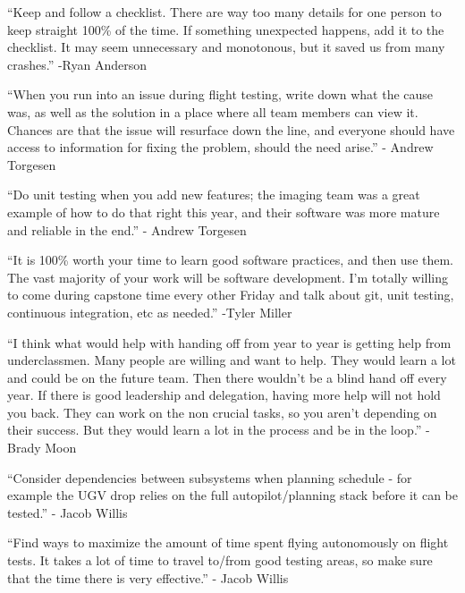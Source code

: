 \documentclass[]{auvsi_doc}
\begin{document}
{}

{``Keep and follow a checklist. There are way too many details for one
person to keep straight 100\% of the time. If something unexpected
happens, add it to the checklist. It may seem unnecessary and
monotonous, but it saved us from many crashes.'' -Ryan Anderson}

{}

{``When you run into an issue during flight testing, write down what the
cause was, as well as the solution in a place where all team members can
view it. Chances are that the issue will resurface down the line, and
everyone should have access to information for fixing the problem,
should the need arise.'' - Andrew Torgesen}

{}

{``Do unit testing when you add new features; the imaging team was a
great example of how to do that right this year, and their software was
more mature and reliable in the end.'' - Andrew Torgesen}

{}

{``It is 100\% worth your time to learn good software practices, and
then use them. The vast majority of your work will be software
development. I'm totally willing to come during capstone time every
other Friday and talk about git, unit testing, continuous integration,
etc as needed.'' -Tyler Miller}

{}

{``I think what would help with handing off from year to year is getting
help from underclassmen. Many people are willing and want to help. They
would learn a lot and could be on the future team. Then there wouldn't
be a blind hand off every year. If there is good leadership and
delegation, having more help will not hold you back. They can work on
the non crucial tasks, so you aren't depending on their success. But
they would learn a lot in the process and be in the loop.'' -Brady Moon}

{}

{``Consider dependencies between subsystems when planning schedule - for
example the UGV drop relies on the full autopilot/planning stack before
it can be tested.'' - Jacob Willis}

{}

{``Find ways to maximize the amount of time spent flying autonomously on
flight tests. It takes a lot of time to travel to/from good testing
areas, so make sure that the time there is very effective.'' - Jacob
Willis}

{}
\end{document}
